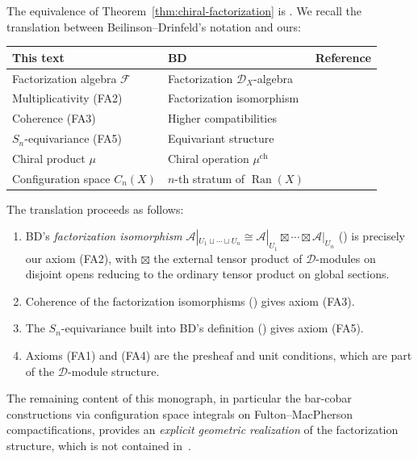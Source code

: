 \begin{remark}
\label{rem:bd-factorization-dictionary}
The equivalence of Theorem~\ref{thm:chiral-factorization} is
\cite[Theorem~3.4.9]{BD04}. We recall the translation between
Beilinson--Drinfeld's notation and ours:
\begin{center}
\renewcommand{\arraystretch}{1.25}
\begin{tabular}{lll}
\textbf{This text} & \textbf{BD~\cite{BD04}} & \textbf{Reference} \\
\hline
Factorization algebra $\mathcal{F}$ & Factorization $\mathcal{D}_X$-algebra &
 \cite[\S3.4.1]{BD04} \\
Multiplicativity (FA2) & Factorization isomorphism &
 \cite[(3.4.4.2)]{BD04} \\
Coherence (FA3) & Higher compatibilities &
 \cite[Proposition~3.4.2]{BD04} \\
$S_n$-equivariance (FA5) & Equivariant structure &
 \cite[\S3.4]{BD04} \\
Chiral product $\mu$ & Chiral operation $\mu^{\operatorname{ch}}$ &
 \cite[\S3.3.1]{BD04} \\
Configuration space $C_n(X)$ & $n$-th stratum of $\operatorname{Ran}(X)$ &
 \cite[\S3.4.10--3.4.12]{BD04} \\
\end{tabular}
\end{center}

The translation proceeds as follows:
\begin{enumerate}
\item BD's \emph{factorization isomorphism}
$\mathcal{A}|_{U_1 \sqcup \cdots \sqcup U_n} \cong
\mathcal{A}|_{U_1} \boxtimes \cdots \boxtimes \mathcal{A}|_{U_n}$
(\cite[(3.4.4.2)]{BD04}) is precisely our axiom (FA2), with
$\boxtimes$ the external tensor product of $\mathcal{D}$-modules
on disjoint opens reducing to the ordinary tensor product on
global sections.
\item Coherence of the factorization isomorphisms
(\cite[Proposition~3.4.2]{BD04}) gives axiom (FA3).
\item The $S_n$-equivariance built into BD's definition
(\cite[\S3.4]{BD04}) gives axiom (FA5).
\item Axioms (FA1) and (FA4) are the presheaf and unit conditions,
which are part of the $\mathcal{D}$-module structure.
\end{enumerate}

The remaining content of this monograph, in particular the
bar-cobar constructions via configuration space integrals on
Fulton--MacPherson compactifications, provides an
\emph{explicit geometric realization} of the factorization
structure, which is not contained in~\cite{BD04}.
\end{remark}

